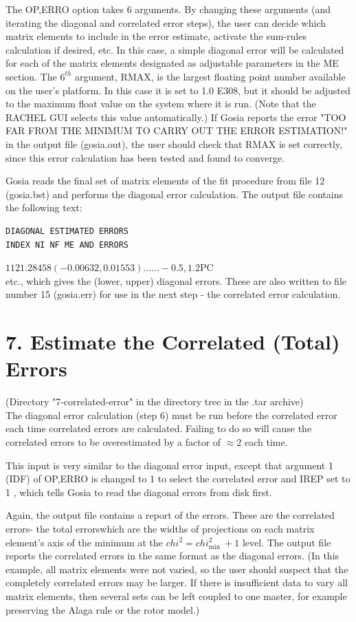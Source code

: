 \documentclass[10pt]{article}
\begin{document}
The OP,ERRO option takes 6 arguments. By changing these arguments (and iterating the diagonal and correlated error steps), the user can decide which matrix elements to include in the error estimate, activate the sum-rules calculation if desired, etc. In this case, a simple diagonal error will be calculated for each of the matrix elements designated as adjustable parameters in the ME section. The $6^{t h}$ argument, RMAX, is the largest floating point number available on the user's platform. In this case it is set to 1.0 E308, but it should be adjusted to the maximum float value on the system where it is run. (Note that the RACHEL GUI selects this value automatically.) If Gosia reports the error "TOO FAR FROM THE MINIMUM TO CARRY OUT THE ERROR ESTIMATION!" in the output file (gosia.out), the user should check that RMAX is set correctly, since this error calculation has been tested and found to converge.

Gosia reads the final set of matrix elements of the fit procedure from file 12 (gosia.bst) and performs the diagonal error calculation. The output file contains the following text:

\begin{verbatim}
DIAGONAL ESTIMATED ERRORS
INDEX NI NF ME AND ERRORS
\end{verbatim}

$1121.28458(-0.00632,0.01553) \ldots \ldots-0.5,1.2 \mathrm{PC}$\\
etc., which gives the (lower, upper) diagonal errors. These are also written to file number 15 (gosia.err) for use in the next step - the correlated error calculation.

\section*{7. Estimate the Correlated (Total) Errors}
(Directory "7-correlated-error" in the directory tree in the .tar archive)\\
The diagonal error calculation (step 6) must be run before the correlated error each time correlated errors are calculated. Failing to do so will cause the correlated errors to be overestimated by a factor of $\approx 2$ each time.

This input is very similar to the diagonal error input, except that argument 1 (IDF) of OP,ERRO is changed to 1 to select the correlated error and IREP set to 1 , which tells Gosia to read the diagonal errors from disk first.

Again, the output file contains a report of the errors. These are the correlated errors- the total errorswhich are the widths of projections on each matrix element's axis of the minimum at the $c h i^{2}=c h i_{\text {min }}^{2}+1$ level. The output file reports the correlated errors in the same format as the diagonal errors. (In this example, all matrix elements were not varied, so the user should suspect that the completely correlated errors may be larger. If there is insufficient data to vary all matrix elements, then several sets can be left coupled to one master, for example preserving the Alaga rule or the rotor model.)
\end{document}
